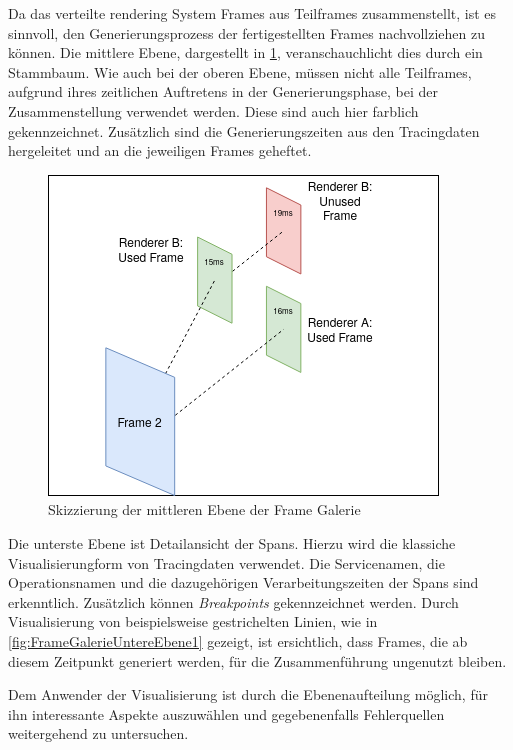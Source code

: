 Da das verteilte rendering System Frames aus Teilframes zusammenstellt, ist es sinnvoll, den Generierungsprozess der fertigestellten Frames nachvollziehen zu können. Die mittlere Ebene, dargestellt in \cref{fig:FrameGalerieMittlereEbene},  veranschauchlicht dies durch ein Stammbaum. Wie auch bei der oberen Ebene, müssen nicht alle Teilframes, aufgrund ihres zeitlichen Auftretens in der Generierungsphase, bei der Zusammenstellung verwendet werden. Diese sind auch hier farblich gekennzeichnet. Zusätzlich sind die Generierungszeiten aus den Tracingdaten hergeleitet und an die jeweiligen Frames geheftet.

\begin{figure}[!ht]
	\centering
	\includegraphics[scale=0.8]{img/Design/FrameGalerieMittlereEbene.png}
	\caption[Mittlere Ebene der Frame Galerie]{ Skizzierung der mittleren Ebene der Frame Galerie}
	\label{fig:FrameGalerieMittlereEbene}
\end{figure}

Die unterste Ebene ist Detailansicht der Spans. Hierzu wird die klassiche Visualisierungform von Tracingdaten verwendet. Die Servicenamen, die Operationsnamen und die dazugehörigen Verarbeitungszeiten der Spans sind erkenntlich. Zusätzlich können \emph{Breakpoints} gekennzeichnet werden. Durch Visualisierung von beispielsweise gestrichelten Linien, wie in \cref{fig:FrameGalerieUntereEbene1} gezeigt, ist ersichtlich, dass Frames, die ab diesem Zeitpunkt generiert werden, für die Zusammenführung ungenutzt bleiben.

Dem Anwender der Visualisierung ist durch die Ebenenaufteilung möglich, für ihn interessante Aspekte auszuwählen und gegebenenfalls Fehlerquellen weitergehend zu untersuchen.

